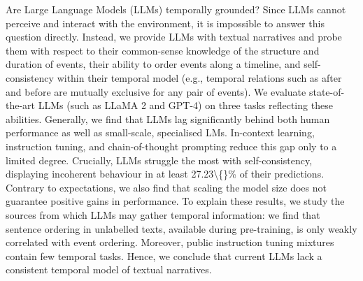 Are Large Language Models (LLMs) temporally grounded? Since LLMs cannot perceive and interact with the environment, it is impossible to answer this question directly. Instead, we provide LLMs with textual narratives and probe them with respect to their common-sense knowledge of the structure and duration of events, their ability to order events along a timeline, and self-consistency within their temporal model (e.g., temporal relations such as after and before are mutually exclusive for any pair of events).  We evaluate state-of-the-art LLMs (such as LLaMA 2 and GPT-4) on three tasks reflecting these abilities. Generally, we find that LLMs lag significantly behind both human performance as well as small-scale, specialised LMs. In-context learning, instruction tuning, and chain-of-thought prompting reduce this gap only to a limited degree. Crucially, LLMs struggle the most with self-consistency, displaying incoherent behaviour in at least 27.23\textbackslash\{\}\% of their predictions. Contrary to expectations, we also find that scaling the model size does not guarantee positive gains in performance. To explain these results, we study the sources from which LLMs may gather temporal information: we find that sentence ordering in unlabelled texts, available during pre-training, is only weakly correlated with event ordering. Moreover, public instruction tuning mixtures contain few temporal tasks. Hence, we conclude that current LLMs lack a consistent temporal model of textual narratives.